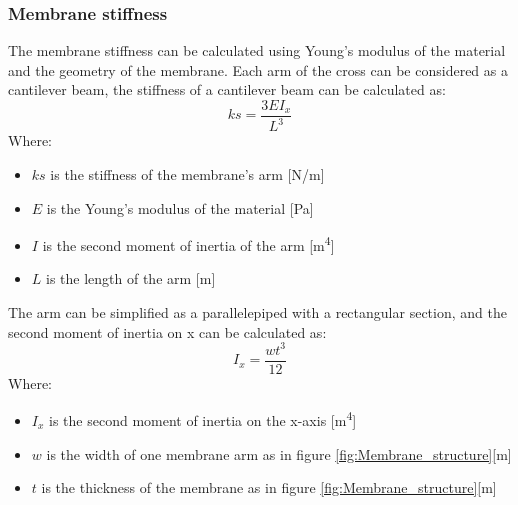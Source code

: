 \subsubsection{Membrane stiffness}
The membrane stiffness can be calculated using Young's modulus of the material and the geometry of the membrane.
Each arm of the cross can be considered as a cantilever beam, the stiffness of a cantilever beam can be calculated as:
\begin{equation}
    ks = \frac{3 E I_x}{L^3}
\end{equation}
Where:
\begin{itemize}
    \item $ks$ is the stiffness of the membrane's arm [N/m]
    \item $E$ is the Young's modulus of the material [Pa]
    \item $I$ is the second moment of inertia of the arm [m\textsuperscript{4}]
    \item $L$ is the length of the arm [m]
\end{itemize}

The arm can be simplified as a parallelepiped with a rectangular section, and the second moment of inertia on x can be calculated as:
\begin{equation}
    I_x = \frac{w t^3}{12}
\end{equation}
Where:
\begin{itemize}
    \item $I_x$ is the second moment of inertia on the x-axis [m\textsuperscript{4}]
    \item $w$ is the width of one membrane arm as in figure \ref{fig:Membrane_structure}[m]
    \item $t$ is the thickness of the membrane as in figure \ref{fig:Membrane_structure}[m]
\end{itemize}

